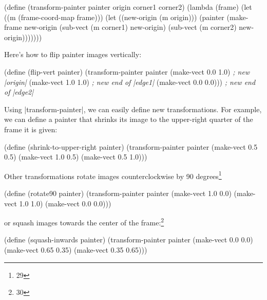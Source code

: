 \begin{Exercise}
\begin{Exercise}
\begin{Exercise}
\begin{Exercise}
\begin{Exercise}
\begin{Exercise}
\begin{Exercise}
\begin{Exercise}
\begin{Exercise}
\begin{schemedisplay}
(define (transform-painter painter origin corner1 corner2)
  (lambda (frame)
    (let ((m (frame-coord-map frame)))
      (let ((new-origin (m origin)))
        (painter
         (make-frame new-origin
                     (sub-vect (m corner1) new-origin)
                     (sub-vect (m corner2) new-origin)))))))
\end{schemedisplay}

Here's how to flip painter images vertically:
\begin{schemedisplay}
(define (flip-vert painter)
  (transform-painter painter
                     (make-vect 0.0 1.0)   \textit{; new \scheme|origin|}
                     (make-vect 1.0 1.0)   \textit{; new end of \scheme|edge1|}
                     (make-vect 0.0 0.0))) \textit{; new end of \scheme|edge2|}
\end{schemedisplay}
Using \scheme|transform-painter|, we can easily define new transformations.
For example, we can define a painter that shrinks its image to the
upper-right quarter of the frame it is given:
\begin{schemedisplay}
(define (shrink-to-upper-right painter)
  (transform-painter painter
                     (make-vect 0.5 0.5)
                     (make-vect 1.0 0.5)
                     (make-vect 0.5 1.0)))
\end{schemedisplay}
Other transformations rotate images counterclockwise by 90 degrees\footnote{29}
\begin{schemedisplay}
(define (rotate90 painter)
  (transform-painter painter
                     (make-vect 1.0 0.0)
                     (make-vect 1.0 1.0)
                     (make-vect 0.0 0.0)))
\end{schemedisplay}
or squash images towards the center of the frame:\footnote{30}
\begin{schemedisplay}
(define (squash-inwards painter)
  (transform-painter painter
                     (make-vect 0.0 0.0)
                     (make-vect 0.65 0.35)
                     (make-vect 0.35 0.65)))
\end{schemedisplay}


\end{Exercise}
\end{Exercise}
\end{Exercise}
\end{Exercise}
\end{Exercise}
\end{Exercise}
\end{Exercise}
\end{Exercise}
\end{Exercise}

